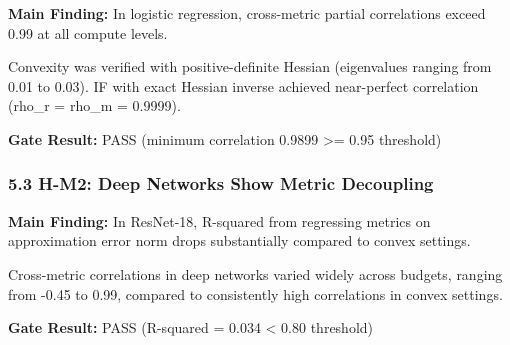 \textbf{Main Finding:} In logistic regression, cross-metric partial correlations exceed 0.99 at all compute levels.

\begin{table}[htbp]
\centering
{}
\end{table}

Convexity was verified with positive-definite Hessian (eigenvalues ranging from 0.01 to 0.03). IF with exact Hessian inverse achieved near-perfect correlation (rho\_r = rho\_m = 0.9999).

\textbf{Gate Result:} PASS (minimum correlation 0.9899 >= 0.95 threshold)

\subsubsection{5.3 H-M2: Deep Networks Show Metric Decoupling}

\textbf{Main Finding:} In ResNet-18, R-squared from regressing metrics on approximation error norm drops substantially compared to convex settings.

\begin{table}[htbp]
\centering
{}
\end{table}

Cross-metric correlations in deep networks varied widely across budgets, ranging from -0.45 to 0.99, compared to consistently high correlations in convex settings.

\textbf{Gate Result:} PASS (R-squared = 0.034 < 0.80 threshold)

